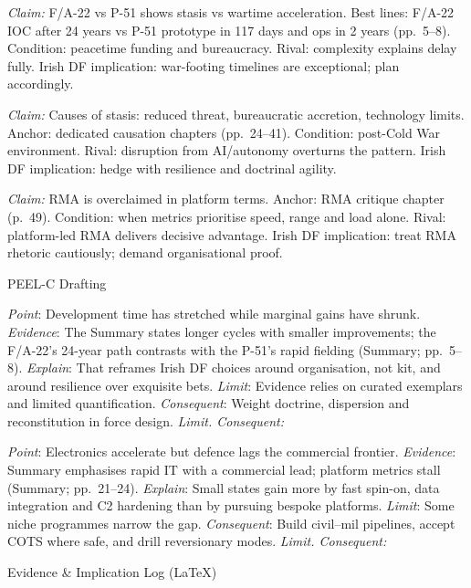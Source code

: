 \textit{Claim:} F/A-22 vs P-51 shows stasis vs wartime acceleration.
Best lines: F/A-22 IOC after 24 years vs P-51 prototype in 117 days and ops in 2 years (pp.~5–8). Condition: peacetime funding and bureaucracy. Rival: complexity explains delay fully. Irish DF implication: war-footing timelines are exceptional; plan accordingly.

\textit{Claim:} Causes of stasis: reduced threat, bureaucratic accretion, technology limits.
Anchor: dedicated causation chapters (pp.~24–41). Condition: post-Cold War environment. Rival: disruption from AI/autonomy overturns the pattern. Irish DF implication: hedge with resilience and doctrinal agility.

\textit{Claim:} RMA is overclaimed in platform terms.
Anchor: RMA critique chapter (p.~49). Condition: when metrics prioritise speed, range and load alone. Rival: platform-led RMA delivers decisive advantage. Irish DF implication: treat RMA rhetoric cautiously; demand organisational proof.

PEEL-C Drafting

\textit{Point}: Development time has stretched while marginal gains have shrunk.
\textit{Evidence}: The Summary states longer cycles with smaller improvements; the F/A-22’s 24-year path contrasts with the P-51’s rapid fielding (Summary; pp.~5–8).
\textit{Explain}: That reframes Irish DF choices around organisation, not kit, and around resilience over exquisite bets.
\textit{Limit}: Evidence relies on curated exemplars and limited quantification.
\textit{Consequent}: Weight doctrine, dispersion and reconstitution in force design.
\textit{Limit. Consequent:}

\textit{Point}: Electronics accelerate but defence lags the commercial frontier.
\textit{Evidence}: Summary emphasises rapid IT with a commercial lead; platform metrics stall (Summary; pp.~21–24).
\textit{Explain}: Small states gain more by fast spin-on, data integration and C2 hardening than by pursuing bespoke platforms.
\textit{Limit}: Some niche programmes narrow the gap.
\textit{Consequent}: Build civil–mil pipelines, accept COTS where safe, and drill reversionary modes.
\textit{Limit. Consequent:}

Evidence & Implication Log (LaTeX)

